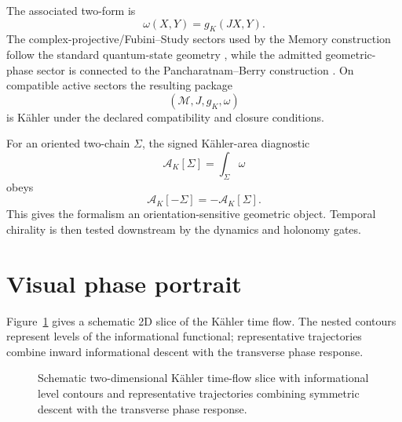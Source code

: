 \documentclass[11pt]{book}
\begin{document}
The associated two-form is
\[
\omega(X,Y)=g_K(JX,Y).
\]
The complex-projective/Fubini--Study sectors used by the Memory construction follow the standard quantum-state geometry \cite{ProvostVallee1980}, while the admitted geometric-phase sector is connected to the Pancharatnam--Berry construction \cite{Pancharatnam1956,Berry1984}. On compatible active sectors the resulting package
\[
\boxed{(\mathcal M,J,g_K,\omega)}
\]
is Kähler under the declared compatibility and closure conditions.

For an oriented two-chain \(\Sigma\), the signed Kähler-area diagnostic
\[
\mathcal A_K[\Sigma]=\int_\Sigma\omega
\]
obeys
\[
\mathcal A_K[-\Sigma]=-\mathcal A_K[\Sigma].
\]
This gives the formalism an orientation-sensitive geometric object. Temporal chirality is then tested downstream by the dynamics and holonomy gates.

\section{Visual phase portrait}
Figure~\ref{fig:kahler-flow-2d} gives a schematic 2D slice of the Kähler time flow. The nested contours represent levels of the informational functional; representative trajectories combine inward informational descent with the transverse phase response.
\begin{figure}[H]
  \centering
  \caption{Schematic two-dimensional Kähler time-flow slice with informational level contours and representative trajectories combining symmetric descent with the transverse phase response.}
  \label{fig:kahler-flow-2d}
\end{figure}
\end{document}
